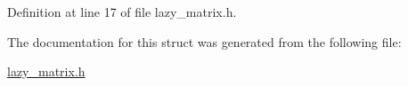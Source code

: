 Definition at line 17 of file lazy\+\_\+matrix.\+h.



The documentation for this struct was generated from the following file\+:\begin{DoxyCompactItemize}
\item 
\mbox{\hyperlink{lazy__matrix_8h}{lazy\+\_\+matrix.\+h}}\end{DoxyCompactItemize}
